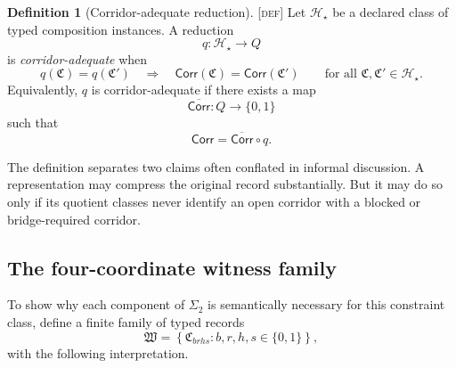 \documentclass[11pt]{article}
\newcommand{\Defn}{\textsc{[def]}}
\theoremstyle{definition}
\newtheorem{sdefinition}{Definition}
\begin{document}
\begin{sdefinition}[Corridor-adequate reduction]
\label{def:corridor-adequate-reduction}
\Defn{} Let $\mathcal H_\star$ be a declared class of typed composition
instances. A reduction
\begin{equation}
q:\mathcal H_\star\longrightarrow Q
\label{eq:reduction-map}
\end{equation}
is \emph{corridor-adequate} when
\begin{equation}
q(\mathfrak C)=q(\mathfrak C')
\quad\Longrightarrow\quad
\mathsf{Corr}(\mathfrak C)=\mathsf{Corr}(\mathfrak C')
\qquad
\text{for all }\mathfrak C,\mathfrak C'\in\mathcal H_\star.
\label{eq:corridor-adequacy}
\end{equation}
Equivalently, $q$ is corridor-adequate if there exists a map
\begin{equation}
\overline{\mathsf{Corr}}:Q\longrightarrow\{0,1\}
\label{eq:reduced-corridor-map}
\end{equation}
such that
\begin{equation}
\mathsf{Corr}=\overline{\mathsf{Corr}}\circ q.
\label{eq:corridor-factorization}
\end{equation}
\end{sdefinition}

The definition separates two claims often conflated in informal discussion. A
representation may compress the original record substantially. But it may do so
only if its quotient classes never identify an open corridor with a blocked or
bridge-required corridor.

\subsection{The four-coordinate witness family}
\label{supp:four-coordinate-family}

To show why each component of $\Sigma_2$ is semantically necessary for this
constraint class, define a finite family of typed records
\begin{equation}
\mathfrak W
=
\left\{
\mathfrak C_{brhs}: b,r,h,s\in\{0,1\}
\right\},
\label{eq:four-coordinate-family}
\end{equation}
with the following interpretation.
\end{document}
